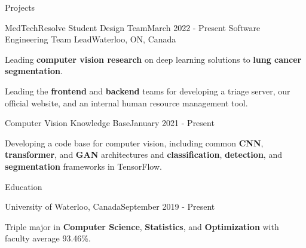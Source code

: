 \documentclass{resume}
\begin{document}
\begin{rSection}{Projects}

    \begin{rSubsection}{MedTechResolve Student Design Team}{March 2022 - Present}
        {Software Engineering Team Lead}{Waterloo, ON, Canada}
        \item Leading \textbf{computer vision research} on deep learning solutions to \textbf{lung cancer segmentation}.
        \item Leading the \textbf{frontend} and \textbf{backend} teams for developing a triage server, our official website, and an internal human resource management tool.
    \end{rSubsection}

    \begin{rSubsection}{Computer Vision Knowledge Base}{January 2021 - Present}{}{}
        \item Developing a code base for computer vision, including common \textbf{CNN}, \textbf{transformer}, and \textbf{GAN} architectures
        and \textbf{classification}, \textbf{detection}, and \textbf{segmentation} frameworks in TensorFlow.
    \end{rSubsection}



\end{rSection}

\begin{rSection}{Education}

    \begin{rSubsection}{University of Waterloo, Canada}{September 2019 - Present}{}{}
        \item Triple major in \textbf{Computer Science}, \textbf{Statistics}, and \textbf{Optimization} with faculty average 93.46\%.
    \end{rSubsection}

\end{rSection}
\end{document}
